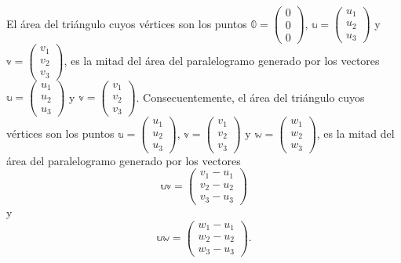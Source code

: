 \begin{observation}
    El área del triángulo cuyos vértices son los puntos $\mathbb{0} = \begin{pmatrix}
        0 \\
        0 \\
        0
    \end{pmatrix}$, $\mathbb{u} = \begin{pmatrix}
        u_1 \\
        u_2 \\
        u_3
    \end{pmatrix}$ y $\mathbb{v} = \begin{pmatrix}
        v_1 \\
        v_2 \\
        v_3
    \end{pmatrix}$, es la mitad del área del paralelogramo generado por los vectores $\mathbb{u} = \begin{pmatrix}
        u_1 \\
        u_2 \\
        u_3
    \end{pmatrix}$ y $\mathbb{v} = \begin{pmatrix}
        v_1 \\
        v_2 \\
        v_3
    \end{pmatrix}$. Consecuentemente, el área del triángulo cuyos vértices son los puntos $\mathbb{u} = \begin{pmatrix}
        u_1 \\
        u_2 \\
        u_3
    \end{pmatrix}$, $\mathbb{v} = \begin{pmatrix}
        v_1 \\
        v_2 \\
        v_3
    \end{pmatrix}$ y $\mathbb{w} = \begin{pmatrix}
        w_1 \\
        w_2 \\
        w_3
    \end{pmatrix}$, es la mitad del área del paralelogramo generado por los vectores
    $$\mathbb{u} \mathbb{v} = \begin{pmatrix}
        v_1 - u_1 \\
        v_2 - u_2 \\
        v_3 - u_3
    \end{pmatrix}$$
    y
    $$\mathbb{u} \mathbb{w} = \begin{pmatrix}
        w_1 - u_1 \\
        w_2 - u_2 \\
        w_3 - u_3
    \end{pmatrix}.$$
\end{observation}

